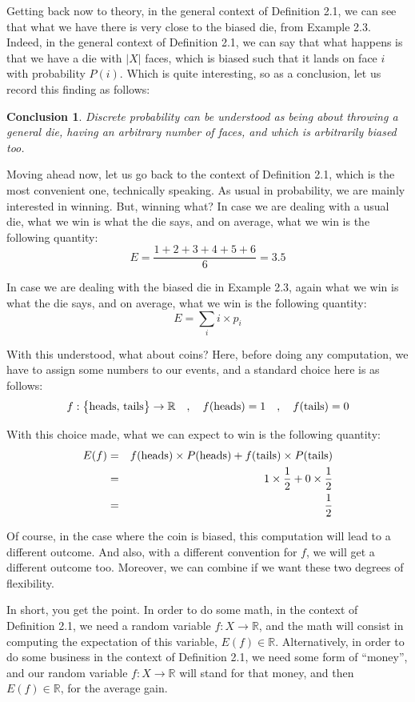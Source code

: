 \documentclass[12pt]{amsbook}
\newtheorem{conclusion}[theorem]{Conclusion}
\begin{document}
\bigskip

Getting back now to theory, in the general context of Definition 2.1, we can see that what we have there is very close to the biased die, from Example 2.3. Indeed, in the general context of Definition 2.1, we can say that what happens is that we have a die with $|X|$ faces, which is biased such that it lands on face $i$ with probability $P(i)$. Which is quite interesting, so as a conclusion, let us record this finding as follows:

\begin{conclusion}
Discrete probability can be understood as being about throwing a general die, having an arbitrary number of faces, and which is arbitrarily biased too. 
\end{conclusion}

Moving ahead now, let us go back to the context of Definition 2.1, which is the most convenient one, technically speaking. As usual in probability, we are mainly interested in winning. But, winning what? In case we are dealing with a usual die, what we win is what the die says, and on average, what we win is the following quantity:
$$E=\frac{1+2+3+4+5+6}{6}=3.5$$

In case we are dealing with the biased die in Example 2.3, again what we win is what the die says, and on average, what we win is the following quantity:
$$E=\sum_ii\times p_i$$

With this understood, what about coins? Here, before doing any computation, we have to assign some numbers to our events, and a standard choice here is as follows:
$$f:\big\{{\rm heads},\,{\rm tails}\big\}\to\mathbb R\quad,\quad f({\rm heads})=1\quad,\quad f({\rm tails})=0$$ 

With this choice made, what we can expect to win is the following quantity:
\begin{eqnarray*}
E(f)
&=&f({\rm heads})\times P({\rm heads})+f({\rm tails})\times P({\rm tails})\\
&=&1\times\frac{1}{2}+0\times\frac{1}{2}\\
&=&\frac{1}{2}
\end{eqnarray*}

Of course, in the case where the coin is biased, this computation will lead to a different outcome. And also, with a different convention for $f$, we will get a different outcome too. Moreover, we can combine if we want these two degrees of flexibility.

\bigskip

In short, you get the point. In order to do some math, in the context of Definition 2.1, we need a random variable $f:X\to\mathbb R$, and the math will consist in computing the expectation of this variable, $E(f)\in\mathbb R$. Alternatively, in order to do some business in the context of Definition 2.1, we need some form of ``money'', and our random variable $f:X\to\mathbb R$ will stand for that money, and then $E(f)\in\mathbb R$, for the average gain.
\end{document}
